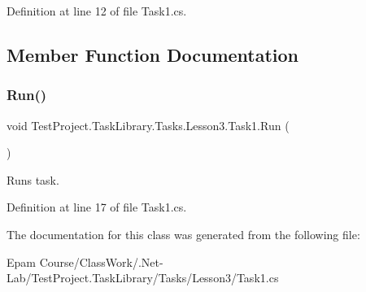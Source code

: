 Definition at line 12 of file Task1.\+cs.



\subsection{Member Function Documentation}
\mbox{\label{class_test_project_1_1_task_library_1_1_tasks_1_1_lesson3_1_1_task1_ac1fa7006556b6719afec0bca93313b4d}} 
\subsubsection{\texorpdfstring{Run()}{Run()}}
{\footnotesize\ttfamily void Test\+Project.\+Task\+Library.\+Tasks.\+Lesson3.\+Task1.\+Run (\begin{DoxyParamCaption}{ }\end{DoxyParamCaption})}



Runs task. 



Definition at line 17 of file Task1.\+cs.



The documentation for this class was generated from the following file\+:\begin{DoxyCompactItemize}
\item 
Epam Course/\+Class\+Work/.\+Net-\/\+Lab/\+Test\+Project.\+Task\+Library/\+Tasks/\+Lesson3/Task1.\+cs\end{DoxyCompactItemize}
